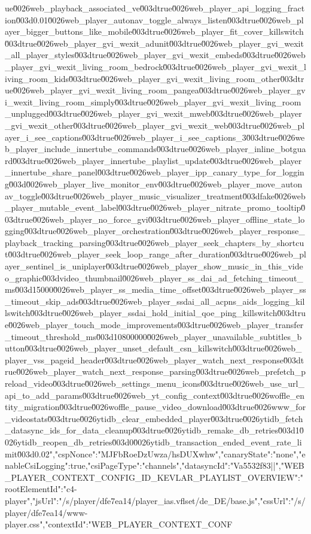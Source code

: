 {ue\u0026web_playback_associated_ve\u003dtrue\u0026web_player_api_logging_fraction\u003d0.01\u0026web_player_autonav_toggle_always_listen\u003dtrue\u0026web_player_bigger_buttons_like_mobile\u003dtrue\u0026web_player_fit_cover_killswitch\u003dtrue\u0026web_player_gvi_wexit_adunit\u003dtrue\u0026web_player_gvi_wexit_all_player_styles\u003dtrue\u0026web_player_gvi_wexit_embeds\u003dtrue\u0026web_player_gvi_wexit_living_room_bedrock\u003dtrue\u0026web_player_gvi_wexit_living_room_kids\u003dtrue\u0026web_player_gvi_wexit_living_room_other\u003dtrue\u0026web_player_gvi_wexit_living_room_pangea\u003dtrue\u0026web_player_gvi_wexit_living_room_simply\u003dtrue\u0026web_player_gvi_wexit_living_room_unplugged\u003dtrue\u0026web_player_gvi_wexit_mweb\u003dtrue\u0026web_player_gvi_wexit_other\u003dtrue\u0026web_player_gvi_wexit_web\u003dtrue\u0026web_player_i_see_captions\u003dtrue\u0026web_player_i_see_captions_3\u003dtrue\u0026web_player_include_innertube_commands\u003dtrue\u0026web_player_inline_botguard\u003dtrue\u0026web_player_innertube_playlist_update\u003dtrue\u0026web_player_innertube_share_panel\u003dtrue\u0026web_player_ipp_canary_type_for_logging\u003d\u0026web_player_live_monitor_env\u003dtrue\u0026web_player_move_autonav_toggle\u003dtrue\u0026web_player_music_visualizer_treatment\u003dfake\u0026web_player_mutable_event_label\u003dtrue\u0026web_player_nitrate_promo_tooltip\u003dtrue\u0026web_player_no_force_gvi\u003dtrue\u0026web_player_offline_state_logging\u003dtrue\u0026web_player_orchestration\u003dtrue\u0026web_player_response_playback_tracking_parsing\u003dtrue\u0026web_player_seek_chapters_by_shortcut\u003dtrue\u0026web_player_seek_loop_range_after_duration\u003dtrue\u0026web_player_sentinel_is_uniplayer\u003dtrue\u0026web_player_show_music_in_this_video_graphic\u003dvideo_thumbnail\u0026web_player_ss_dai_ad_fetching_timeout_ms\u003d15000\u0026web_player_ss_media_time_offset\u003dtrue\u0026web_player_ss_timeout_skip_ads\u003dtrue\u0026web_player_ssdai_all_acpns_aids_logging_killswitch\u003dtrue\u0026web_player_ssdai_hold_initial_qoe_ping_killswitch\u003dtrue\u0026web_player_touch_mode_improvements\u003dtrue\u0026web_player_transfer_timeout_threshold_ms\u003d10800000\u0026web_player_unavailable_subtitles_button\u003dtrue\u0026web_player_unset_default_csn_killswitch\u003dtrue\u0026web_player_vss_pageid_header\u003dtrue\u0026web_player_watch_next_response\u003dtrue\u0026web_player_watch_next_response_parsing\u003dtrue\u0026web_prefetch_preload_video\u003dtrue\u0026web_settings_menu_icons\u003dtrue\u0026web_use_url_api_to_add_params\u003dtrue\u0026web_yt_config_context\u003dtrue\u0026woffle_entity_migration\u003dtrue\u0026woffle_pause_video_download\u003dtrue\u0026www_for_videostats\u003dtrue\u0026ytidb_clear_embedded_player\u003dtrue\u0026ytidb_fetch_datasync_ids_for_data_cleanup\u003dtrue\u0026ytidb_remake_db_retries\u003d1\u0026ytidb_reopen_db_retries\u003d0\u0026ytidb_transaction_ended_event_rate_limit\u003d0.02","cspNonce":"MJFbRoeDzUwza/hsDUXwhw","canaryState":"none","enableCsiLogging":true,"csiPageType":"channels","datasyncId":"Va5532f83||"},"WEB_PLAYER_CONTEXT_CONFIG_ID_KEVLAR_PLAYLIST_OVERVIEW":{"rootElementId":"c4-player","jsUrl":"/s/player/dfe7ea14/player_ias.vflset/de_DE/base.js","cssUrl":"/s/player/dfe7ea14/www-player.css","contextId":"WEB_PLAYER_CONTEXT_CONF}
